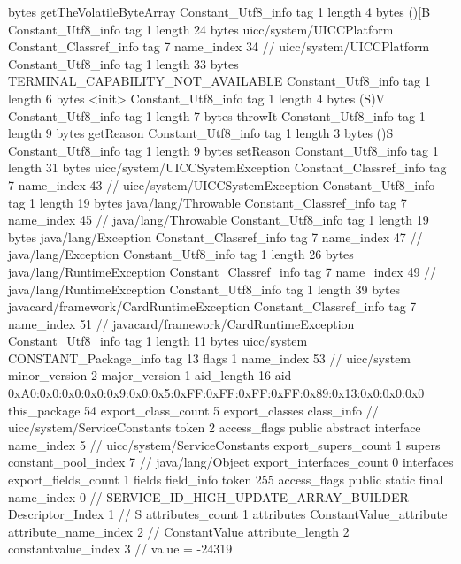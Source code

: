 {{{			bytes	getTheVolatileByteArray
		}
		Constant_Utf8_info {
			tag	1
			length	4
			bytes	()[B
		}
		Constant_Utf8_info {
			tag	1
			length	24
			bytes	uicc/system/UICCPlatform
		}
		Constant_Classref_info {
			tag	7
			name_index	34		// uicc/system/UICCPlatform
		}
		Constant_Utf8_info {
			tag	1
			length	33
			bytes	TERMINAL_CAPABILITY_NOT_AVAILABLE
		}
		Constant_Utf8_info {
			tag	1
			length	6
			bytes	<init>
		}
		Constant_Utf8_info {
			tag	1
			length	4
			bytes	(S)V
		}
		Constant_Utf8_info {
			tag	1
			length	7
			bytes	throwIt
		}
		Constant_Utf8_info {
			tag	1
			length	9
			bytes	getReason
		}
		Constant_Utf8_info {
			tag	1
			length	3
			bytes	()S
		}
		Constant_Utf8_info {
			tag	1
			length	9
			bytes	setReason
		}
		Constant_Utf8_info {
			tag	1
			length	31
			bytes	uicc/system/UICCSystemException
		}
		Constant_Classref_info {
			tag	7
			name_index	43		// uicc/system/UICCSystemException
		}
		Constant_Utf8_info {
			tag	1
			length	19
			bytes	java/lang/Throwable
		}
		Constant_Classref_info {
			tag	7
			name_index	45		// java/lang/Throwable
		}
		Constant_Utf8_info {
			tag	1
			length	19
			bytes	java/lang/Exception
		}
		Constant_Classref_info {
			tag	7
			name_index	47		// java/lang/Exception
		}
		Constant_Utf8_info {
			tag	1
			length	26
			bytes	java/lang/RuntimeException
		}
		Constant_Classref_info {
			tag	7
			name_index	49		// java/lang/RuntimeException
		}
		Constant_Utf8_info {
			tag	1
			length	39
			bytes	javacard/framework/CardRuntimeException
		}
		Constant_Classref_info {
			tag	7
			name_index	51		// javacard/framework/CardRuntimeException
		}
		Constant_Utf8_info {
			tag	1
			length	11
			bytes	uicc/system
		}
		CONSTANT_Package_info {
			tag	13
			flags	1
			name_index	53		// uicc/system
			minor_version	2
			major_version	1
			aid_length	16
			aid	0xA0:0x0:0x0:0x0:0x9:0x0:0x5:0xFF:0xFF:0xFF:0xFF:0x89:0x13:0x0:0x0:0x0
		}
	}
	this_package	54
	export_class_count	5
	export_classes {
		class_info {		// uicc/system/ServiceConstants
			token	2
			access_flags	public abstract interface
			name_index	5		// uicc/system/ServiceConstants
			export_supers_count	1
			supers {
				constant_pool_index	7		// java/lang/Object
			}
			export_interfaces_count	0
			interfaces {
			}
			export_fields_count	1
			fields {
			field_info {
				token	255
				access_flags	public static final
				name_index	0		// SERVICE_ID_HIGH_UPDATE_ARRAY_BUILDER
				Descriptor_Index	1		// S
				attributes_count	1
				attributes {
				ConstantValue_attribute {
					attribute_name_index	2		// ConstantValue
					attribute_length	2
					constantvalue_index	3		// value = -24319
}}}}}}}
